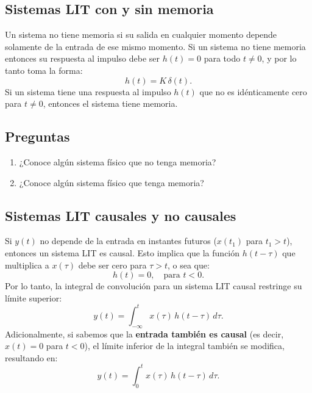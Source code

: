 \subsection{Sistemas LIT con y sin memoria}

Un sistema no tiene memoria si su salida en cualquier momento depende solamente de la entrada de ese mismo momento. Si un sistema no tiene memoria entonces su respuesta al impulso debe ser $h(t) = 0$ para todo $t \neq 0$, y por lo tanto toma la forma:
\begin{equation}
	h(t) = K \, \delta(t) .
\end{equation}
Si un sistema tiene una respuesta al impulso $h(t)$ que no es idénticamente cero para $t \neq 0$, entonces el sistema tiene memoria.

\subsection{Preguntas}

\begin{enumerate}
	\item ¿Conoce algún sistema físico que no tenga memoria?
	\item ¿Conoce algún sistema físico que tenga memoria?
\end{enumerate}

\subsection{Sistemas LIT causales y no causales}

Si $y(t)$ no depende de la entrada en instantes futuros ($x(t_{1})$ para $t_{1} > t$), entonces un sistema LIT es causal. Esto implica que la función $h(t-\tau)$ que multiplica a $x(\tau)$ debe ser cero para $\tau > t$, o sea que:
\begin{equation}
	h(t) = 0, \quad \text{para } t < 0.
\end{equation}
Por lo tanto, la integral de convolución para un sistema LIT causal restringe su límite superior:
\begin{equation}
	y(t) = \int_{-\infty}^{t} x(\tau) \, h(t-\tau) \, d\tau .
\end{equation}
Adicionalmente, si sabemos que la \textbf{entrada también es causal} (es decir, $x(t) = 0$ para $t < 0$), el límite inferior de la integral también se modifica, resultando en:
\begin{equation}
	y(t) = \int_{0}^{t} x(\tau) \, h(t-\tau) \, d\tau .
\end{equation}

